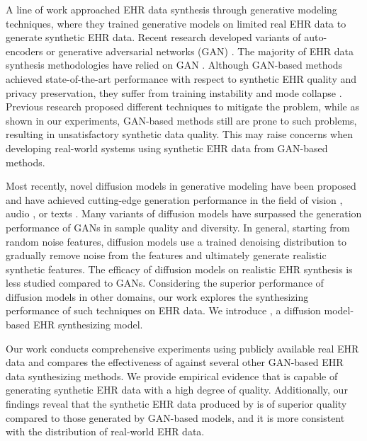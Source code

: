 A line of work approached EHR data synthesis through generative modeling techniques, where they trained generative models on limited real EHR data to generate synthetic EHR data. 
Recent research developed variants of auto-encoders \citep{autoencoder,Biswal2020EVAGL} or generative adversarial networks (GAN) \citep{NIPS2014_gan,pmlr-v68-choi17a}. 
The majority of EHR data synthesis methodologies have relied on GAN \citep{pmlr-v68-choi17a,medbgan,EHRgan,Yan2020GeneratingEH}. 
Although GAN-based methods achieved state-of-the-art performance with respect to synthetic EHR quality and privacy preservation, they suffer from training instability and mode collapse \citep{che2017mode}. 
Previous research proposed different techniques to mitigate the problem, while as shown in our experiments, GAN-based methods still are prone to such problems, resulting in unsatisfactory synthetic data quality. 
This may raise concerns when developing real-world systems using synthetic EHR data from GAN-based methods.

Most recently, novel diffusion models \citep{pmlr-v37-sohl-dickstein15} in generative modeling have been proposed and have achieved cutting-edge generation performance in the field of vision \citep{ddpm,song2021scorebased}, audio \citep{kong2021diffwave}, or texts \citep{li2022diffusionlm,gong2023diffuseq,Yuan2022SeqDiffuSeqTD}. 
Many variants of diffusion models have surpassed the generation performance of GANs in sample quality and diversity. 
In general, starting from random noise features, diffusion models use a trained denoising distribution to gradually remove noise from the features and ultimately generate realistic synthetic features. 
The efficacy of diffusion models on realistic EHR synthesis is less studied compared to GANs. 
Considering the superior performance of diffusion models in other domains, our work explores the synthesizing performance of such techniques on EHR data. 
We introduce \modelname, a diffusion model-based EHR synthesizing model. 

Our work conducts comprehensive experiments using publicly available real EHR data and compares the effectiveness of \modelname against several other GAN-based EHR data synthesizing methods. 
We provide empirical evidence that \modelname is capable of generating synthetic EHR data with a high degree of quality. 
Additionally, our findings reveal that the synthetic EHR data produced by \modelname is of superior quality compared to those generated by GAN-based models, and it is more consistent with the distribution of real-world EHR data. 


